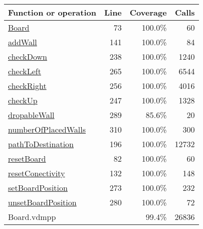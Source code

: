 \begin{longtable}{|l|r|r|r|}
\hline
Function or operation & Line & Coverage & Calls \\
\hline
\hline
\hyperref[Board:73]{Board} & 73&100.0\% & 60 \\
\hline
\hyperref[addWall:141]{addWall} & 141&100.0\% & 84 \\
\hline
\hyperref[checkDown:238]{checkDown} & 238&100.0\% & 1240 \\
\hline
\hyperref[checkLeft:265]{checkLeft} & 265&100.0\% & 6544 \\
\hline
\hyperref[checkRight:256]{checkRight} & 256&100.0\% & 4016 \\
\hline
\hyperref[checkUp:247]{checkUp} & 247&100.0\% & 1328 \\
\hline
\hyperref[dropableWall:289]{dropableWall} & 289&85.6\% & 20 \\
\hline
\hyperref[numberOfPlacedWalls:310]{numberOfPlacedWalls} & 310&100.0\% & 300 \\
\hline
\hyperref[pathToDestination:196]{pathToDestination} & 196&100.0\% & 12732 \\
\hline
\hyperref[resetBoard:82]{resetBoard} & 82&100.0\% & 60 \\
\hline
\hyperref[resetConectivity:132]{resetConectivity} & 132&100.0\% & 148 \\
\hline
\hyperref[setBoardPosition:273]{setBoardPosition} & 273&100.0\% & 232 \\
\hline
\hyperref[unsetBoardPosition:280]{unsetBoardPosition} & 280&100.0\% & 72 \\
\hline
\hline
Board.vdmpp & & 99.4\% & 26836 \\
\hline
\end{longtable}

